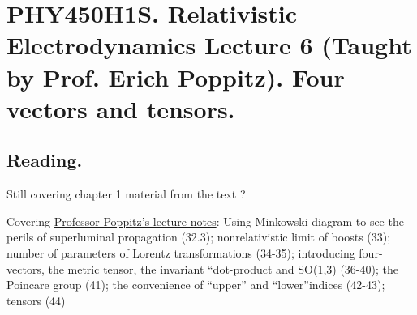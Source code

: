 
%

\chapter{PHY450H1S.  Relativistic Electrodynamics Lecture 6 (Taught by Prof. Erich Poppitz).  Four vectors and tensors.}
\label{chap:relativisticElectrodynamicsL6}
{}
\date{Jan 18, 2011}

\beginArtNoToc

\section{Reading.}

Still covering chapter 1 material from the text \cite{landau1980classical}?

Covering \href{http://www.physics.utoronto.ca/~poppitz/e-poppitz/PHY450_files/RelEM27-44.pdf}{Professor Poppitz's lecture notes}: Using Minkowski diagram to see the perils of superluminal propagation (32.3); nonrelativistic limit of boosts (33); number of parameters of Lorentz transformations (34-35); introducing four-vectors, the metric tensor, the invariant ``dot-product and SO(1,3) (36-40); the Poincare group (41); the convenience of ``upper'' and ``lower''indices (42-43); tensors (44) 

\section{}

\EndArticle
